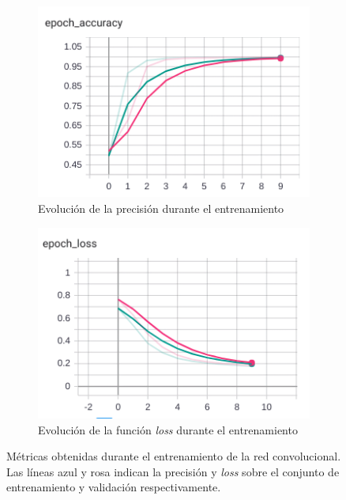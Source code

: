 \begin{figure}[h!]
    \begin{subfigure}[c]{.5\textwidth}
      \centering
      \includegraphics[width=.9\linewidth]{img/semafAcc.png}
      \caption[Precisión del entrenamiento del modelo de semáforos]{Evolución de la precisión durante el entrenamiento}
      \label{fig:semafacc}
    \end{subfigure}%
    \begin{subfigure}[c]{.5\textwidth}
      \centering
      \includegraphics[width=.9\linewidth]{img/semafLoss.png}
      \caption[\textit{Loss} del entrenamiento del modelo de semáforos]{Evolución de la función \textit{loss} durante el entrenamiento}
      \label{fig:semafloss}
    \end{subfigure}
    
    \caption[Métricas obtenidas del entrenamiento del analizador de semáforos]{Métricas obtenidas durante el entrenamiento de la red convolucional. Las líneas azul y rosa indican la precisión y \textit{loss} sobre el conjunto de entrenamiento y validación respectivamente.}
    \label{fig:graficasSemaf}
\end{figure}

